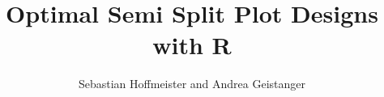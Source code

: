 \documentclass[twocolumn]{article}
\begin{document}
\title{Optimal Semi Split Plot Designs with R}
\author{Sebastian Hoffmeister and Andrea Geistanger}

\maketitle

\tableofcontents










\clearpage



\end{document}
